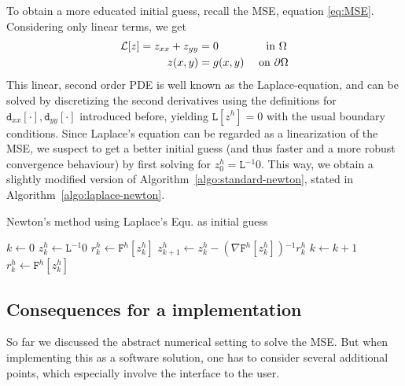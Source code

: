 \documentclass[11pt]{scrartcl}
\newcommand{\mSurfDisc}[1]{\ensuremath{\mathtt{F}^h\left[#1\right]}}
\newcommand{\Dxx}[1]{\ensuremath{\mathtt{d}_{xx}[#1]}}
\newcommand{\Dyy}[1]{\ensuremath{\mathtt{d}_{yy}[#1]}}
\newcommand{\inv}{\ensuremath{^{-1}}}
\begin{document}
To obtain a more educated initial guess, recall the MSE, equation \eqref{eq:MSE}. Considering only linear terms, we get 
\begin{align}
	\mathcal{L} [z] = z_{xx} + z_{yy} &= 0 \quad\quad\quad\quad \text{ in } \Omega \\
	z(x,y) &= g(x,y) \quad \text{ on } \partial\Omega \notag 
\end{align}\newpage
This linear, second order PDE is well known as the Laplace-equation, and can be solved by discretizing the second derivatives using the definitions for $\Dxx{\cdot},\Dyy{\cdot}$ introduced before, yielding $\mathtt{L}[z^h]=0 $ with the usual boundary conditions. Since Laplace's equation can be regarded as a linearization of the MSE, we suspect to get a better initial guess (and thus faster and a more robust convergence behaviour) by first solving for $z^h_0= \mathtt{L}\inv 0$. This way, we obtain a slightly modified version of Algorithm~\ref{algo:standard-newton}, stated in Algorithm~\ref{algo:laplace-newton}.

\begin{algorithm}
	\caption{Newton's method using Laplace's Equ. as initial guess}\label{algo:laplace-newton}
	\begin{algorithmic}
		\State $k \gets 0$ 
		\State $z^h_k \gets \mathtt{L}\inv 0 $ 
		\State $r^h_k \gets \mSurfDisc{z^h_k}$
		\State $z^h_{k+1} \gets z^h_{k} - \left(\nabla\mSurfDisc{z^h_k}\right)\inv r^h_k $
		\State $k \gets k+1$ 
		\State $r^h_k \gets \mSurfDisc{z^h_k}$
		\EndWhile
	\end{algorithmic}
\end{algorithm}

\clearpage
\subsection{Consequences for a implementation}
So far we discussed the abstract numerical setting to solve the MSE. But when implementing this as a software solution, one has to consider several additional points, which especially involve the interface to the user.
\end{document}
